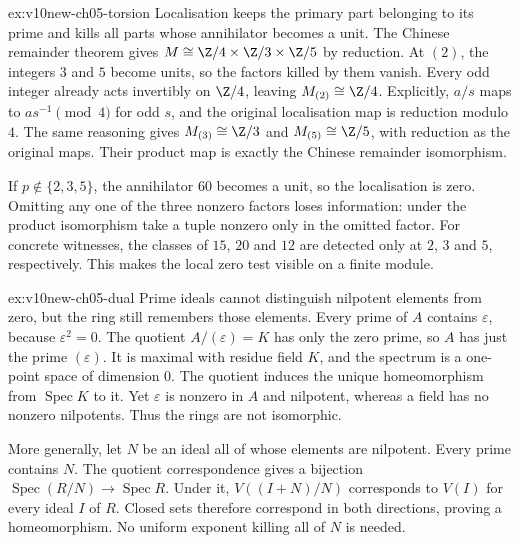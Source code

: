 \begin{solution}{ex:v10new-ch05-torsion}
\idea Localisation keeps the primary part belonging to its prime and kills all parts whose annihilator becomes a unit.
\writeup The Chinese remainder theorem gives $M\cong\Z/4\times\Z/3\times\Z/5$ by reduction. At $(2)$, the integers $3$ and $5$ become units, so the factors killed by them vanish. Every odd integer already acts invertibly on $\Z/4$, leaving $M_{(2)}\cong\Z/4$. Explicitly, $a/s$ maps to $a s^{-1}\pmod4$ for odd $s$, and the original localisation map is reduction modulo $4$. The same reasoning gives $M_{(3)}\cong\Z/3$ and $M_{(5)}\cong\Z/5$, with reduction as the original maps. Their product map is exactly the Chinese remainder isomorphism.

If $p\notin\{2,3,5\}$, the annihilator $60$ becomes a unit, so the localisation is zero. Omitting any one of the three nonzero factors loses information: under the product isomorphism take a tuple nonzero only in the omitted factor. For concrete witnesses, the classes of $15$, $20$ and $12$ are detected only at $2$, $3$ and $5$, respectively. This makes the local zero test visible on a finite module.
\end{solution}

\begin{solution}{ex:v10new-ch05-dual}
\idea Prime ideals cannot distinguish nilpotent elements from zero, but the ring still remembers those elements.
\writeup Every prime of $A$ contains $\varepsilon$, because $\varepsilon^2=0$. The quotient $A/(\varepsilon)=K$ has only the zero prime, so $A$ has just the prime $(\varepsilon)$. It is maximal with residue field $K$, and the spectrum is a one-point space of dimension $0$. The quotient induces the unique homeomorphism from $\operatorname{Spec}K$ to it. Yet $\varepsilon$ is nonzero in $A$ and nilpotent, whereas a field has no nonzero nilpotents. Thus the rings are not isomorphic.

More generally, let $N$ be an ideal all of whose elements are nilpotent. Every prime contains $N$. The quotient correspondence gives a bijection $\operatorname{Spec}(R/N)\to\operatorname{Spec}R$. Under it, $V((I+N)/N)$ corresponds to $V(I)$ for every ideal $I$ of $R$. Closed sets therefore correspond in both directions, proving a homeomorphism. No uniform exponent killing all of $N$ is needed.
\end{solution}

